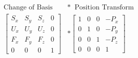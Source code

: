 \documentclass[preview]{standalone}
\begin{document}
\begin{align*}
  \text{Change of Basis} \; \; &* \; \; \text{Position Transform} \\
  \begin{bmatrix}
    S_x & S_y & S_z & 0 \\
    U_x & U_y & U_z & 0 \\
    F_x & F_y & F_z & 0 \\
    0 & 0 & 0 & 1 
  \end{bmatrix} &*
  \begin{bmatrix}
    1 & 0 & 0 & -P_x \\
    0 & 1 & 0 & -P_y \\
    0 & 0 & 1 & -P_z \\
    0 & 0 & 0 & 1 
  \end{bmatrix}
\end{align*}
\end{document}

